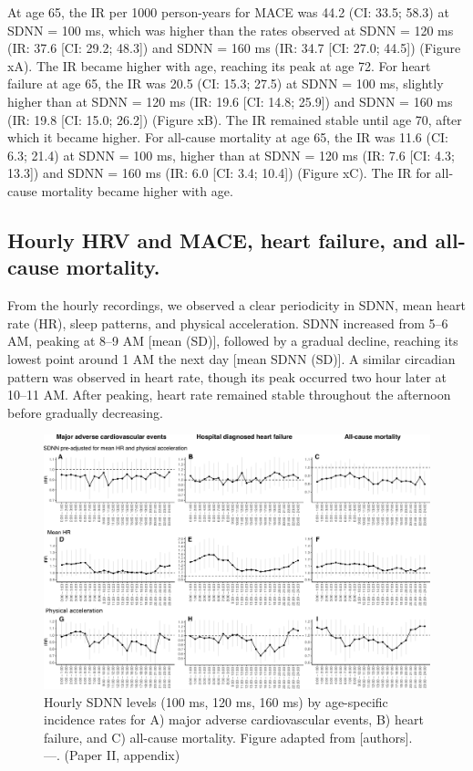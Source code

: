 \documentclass[
  a4paper,
  headsepline=true,
  open=any]{scrbook}
\begin{document}
At age 65, the IR per 1000 person-years for MACE was 44.2 (CI: 33.5;
58.3) at SDNN = 100 ms, which was higher than the rates observed at SDNN
= 120 ms (IR: 37.6 {[}CI: 29.2; 48.3{]}) and SDNN = 160 ms (IR: 34.7
{[}CI: 27.0; 44.5{]}) (Figure xA). The IR became higher with age,
reaching its peak at age 72. For heart failure at age 65, the IR was
20.5 (CI: 15.3; 27.5) at SDNN = 100 ms, slightly higher than at SDNN =
120 ms (IR: 19.6 {[}CI: 14.8; 25.9{]}) and SDNN = 160 ms (IR: 19.8
{[}CI: 15.0; 26.2{]}) (Figure xB). The IR remained stable until age 70,
after which it became higher. For all-cause mortality at age 65, the IR
was 11.6 (CI: 6.3; 21.4) at SDNN = 100 ms, higher than at SDNN = 120 ms
(IR: 7.6 {[}CI: 4.3; 13.3{]}) and SDNN = 160 ms (IR: 6.0 {[}CI: 3.4;
10.4{]}) (Figure xC). The IR for all-cause mortality became higher with
age.

\hypertarget{hourly-hrv-and-mace-heart-failure-and-all-cause-mortality.}{%
\subsection{Hourly HRV and MACE, heart failure, and all-cause
mortality.}\label{hourly-hrv-and-mace-heart-failure-and-all-cause-mortality.}}

From the hourly recordings, we observed a clear periodicity in SDNN,
mean heart rate (HR), sleep patterns, and physical acceleration. SDNN
increased from 5--6 AM, peaking at 8--9 AM {[}mean (SD){]}, followed by
a gradual decline, reaching its lowest point around 1 AM the next day
{[}mean SDNN (SD){]}. A similar circadian pattern was observed in heart
rate, though its peak occurred two hour later at 10--11 AM. After
peaking, heart rate remained stable throughout the afternoon before
gradually decreasing.

\begin{figure}

{\centering \includegraphics[width=7in,height=\textheight]{images/figure_ADD_PRO_risk_by_hour.pdf}

}

\caption{Hourly SDNN levels (100 ms, 120 ms, 160 ms) by age-specific
incidence rates for A) major adverse cardiovascular events, B) heart
failure, and C) all-cause mortality. Figure adapted from {[}authors{]}.
---. (Paper II, appendix)}

\end{figure}
\end{document}
